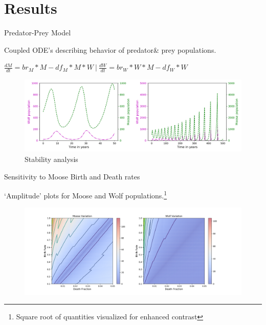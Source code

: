 \documentclass{beamer}
\begin{document}
\section{Results}
\begin{frame}{Predator-Prey Model}
	\item Coupled ODE's describing behavior of predator\& prey populations.
	\item
$\frac{dM}{dt}=br_{M}*M-df_{M}*M*W \ |\  \frac{dW}{dt}=br_{W}*W*M-df_{W}*W$	
		\begin{figure}
		\includegraphics[scale=0.35]{../plot_notebooks/short_and_long_runs}
		\caption{Stability analysis}
		\end{figure}
\end{frame}

\begin{frame}{Sensitivity to Moose Birth and Death rates}
	\item `Amplitude' plots for Moose and Wolf populations.\footnote{Square root of quantities visualized for enhanced contrast}
	\begin{figure}
		\vspace*{-0.25cm}\hspace*{-1.1cm}\includegraphics[scale=0.35]{../plot_notebooks/sqrt_amp_vary_M}
	\end{figure}
\end{frame}
\end{document}
